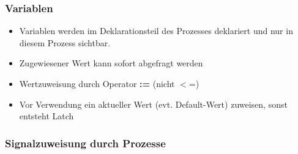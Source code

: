 \begin{multicols}{2}
			\subsubsection{Variablen}			
			\begin{itemize}
					\itemsep0em
					\item Variablen werden im Deklarationsteil des Prozesses deklariert 
						und nur in diesem Prozess sichtbar.
					\item Zugewiesener Wert kann sofort abgefragt werden
					\item Wertzuweisung durch Operator \textbf{:=} (nicht $<$=)
					\item Vor Verwendung ein aktueller Wert (evt. Default-Wert) zuweisen, sonst entsteht Latch
				\end{itemize}
				
				
				\subsubsection{Signalzuweisung durch Prozesse}
				
		\end{multicols}

